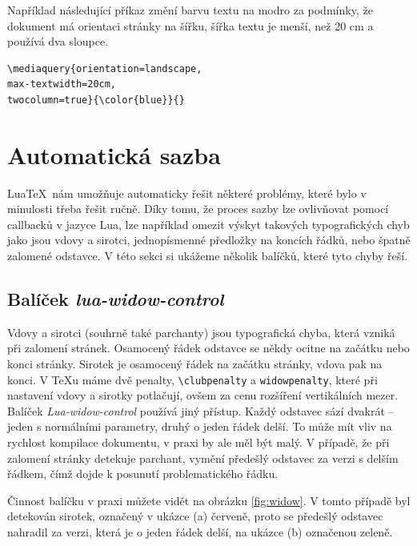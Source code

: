 \documentclass{csbulletin}
\newcommand\balicek[1]{\textit{#1}}
\begin{document}
Například následující příkaz změní barvu textu na modro za podmínky, že dokument 
má orientaci stránky na šířku, šířka textu je menší, než 20 cm a používá dva sloupce.

\begin{verbatim}
\mediaquery{orientation=landscape,
max-textwidth=20cm,
twocolumn=true}{\color{blue}}{}
\end{verbatim}


\section{Automatická sazba}

Lua\TeX\ nám umožňuje automaticky řešit některé problémy, které bylo v
minulosti třeba řešit ručně. Díky tomu, že proces sazby lze ovlivňovat pomocí
callbacků v jazyce Lua, lze například omezit výskyt takových typografických
chyb jako jsou vdovy a sirotci, jednopísmenné předložky na koncích řádků, nebo
špatně zalomené odstavce. V této sekci si ukážeme několik balíčků, které tyto
chyby řeší.



\subsection{Balíček \balicek{lua-widow-control}}

Vdovy a sirotci (souhrně také parchanty) jsou typografická chyba, která vzniká
při zalomení stránek. Osamocený řádek odstavce se někdy ocitne na začátku nebo
konci stránky. Sirotek je osamocený řádek na začátku stránky, vdova pak na
konci. V \TeX u máme dvě penalty, \verb|\clubpenalty| a \verb|widowpenalty|,
které při nastavení vdovy a sirotky potlačují, ovšem za cenu rozšíření
vertikálních mezer. Balíček
\balicek{Lua-widow-control} \cite{lua-widow-control}
používá jiný přístup. Každý odstavec sází dvakrát -- jeden s normálními
parametry, druhý o jeden řádek delší. To může mít vliv na rychlost kompilace
dokumentu, v praxi by ale měl být malý. V případě, že při zalomení stránky
detekuje parchant, vymění předešlý odstavec za verzi s delším řádkem, čímž
dojde k posunutí problematického řádku.

Činnost balíčku v praxi můžete vidět na obrázku \ref{fig:widow}. V tomto
případě byl detekován sirotek, označený v ukázce (a) červeně, proto se předešlý
odstavec nahradil za verzi, která je o jeden řádek delší, na ukázce (b)
označenou zeleně. 

  
\end{document}
